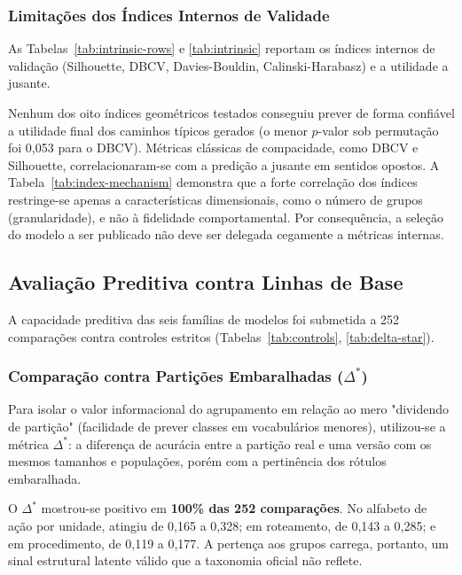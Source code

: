 

\subsubsection{Limitações dos Índices Internos de Validade}\label{sec:res-indices}

As Tabelas~\ref{tab:intrinsic-rows} e \ref{tab:intrinsic} reportam os índices internos de validação (Silhouette, DBCV, Davies-Bouldin, Calinski-Harabasz) e a utilidade a jusante. 




Nenhum dos oito índices geométricos testados conseguiu prever de forma confiável a utilidade final dos caminhos típicos gerados (o menor $p$-valor sob permutação foi 0,053 para o DBCV). Métricas clássicas de compacidade, como DBCV e Silhouette, correlacionaram-se com a predição a jusante em sentidos opostos. A Tabela~\ref{tab:index-mechanism} demonstra que a forte correlação dos índices restringe-se apenas a características dimensionais, como o número de grupos (granularidade), e não à fidelidade comportamental. Por consequência, a seleção do modelo a ser publicado não deve ser delegada cegamente a métricas internas.



\subsection{Avaliação Preditiva contra Linhas de Base}\label{sec:res-caminhos}

A capacidade preditiva das seis famílias de modelos foi submetida a 252 comparações contra controles estritos (Tabelas~\ref{tab:controls}, \ref{tab:delta-star}). 

\subsubsection{Comparação contra Partições Embaralhadas (\texorpdfstring{$\Delta^*$}{Delta*})}\label{sec:res-sinal}

Para isolar o valor informacional do agrupamento em relação ao mero "dividendo de partição" (facilidade de prever classes em vocabulários menores), utilizou-se a métrica $\Delta^*$: a diferença de acurácia entre a partição real e uma versão com os mesmos tamanhos e populações, porém com a pertinência dos rótulos embaralhada.

O $\Delta^*$ mostrou-se positivo em \textbf{100\% das 252 comparações}. No alfabeto de ação por unidade, atingiu de 0,165 a 0,328; em roteamento, de 0,143 a 0,285; e em procedimento, de 0,119 a 0,177. A pertença aos grupos carrega, portanto, um sinal estrutural latente válido que a taxonomia oficial não reflete. 

